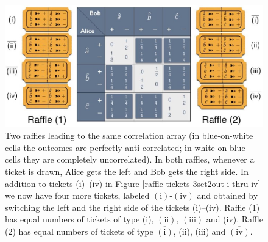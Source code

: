 \begin{figure}[h]   
 \centering
   \includegraphics[width=6in]{CA-3set2out-raffle-25i25ii25iii25iv.jpeg} 
   \caption{Two raffles leading to the same correlation array (in blue-on-white cells the outcomes are perfectly anti-correlated; in white-on-blue cells they are completely uncorrelated). In both raffles, whenever a ticket is drawn, Alice gets the left and Bob gets the right side. In addition to tickets (i)--(iv) in Figure \ref{raffle-tickets-3set2out-i-thru-iv} we now have four more tickets, labeled $\overline{(\mathrm{i})}$-$\overline{(\mathrm{iv})}$ and obtained by switching the left and the right side of the tickets (i)--(iv).  Raffle (1) has equal numbers of tickets of type (i), $\overline{(\mathrm{ii})}$, $\overline{(\mathrm{iii})}$ and (iv). Raffle (2) has equal numbers of tickets of type $\overline{(\mathrm{i})}$, (ii), (iii) and $\overline{(\mathrm{iv})}$.}
   \label{CA-3set2out-raffle-25i25ii25iii25iv}
\end{figure}

